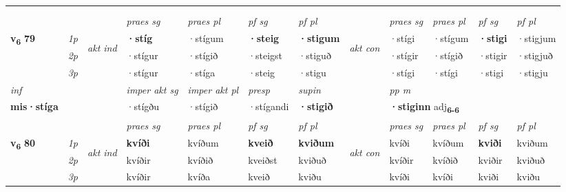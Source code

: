 \begin{longtable}[l]{X>{\footnotesize\itshape}llXXXXlXXXX}
\midrule

   & \\*
  & \\
   \midrule
 & &   & \textit{praes sg}  & \textit{praes pl}    & \textit{ pf sg} & \textit{pf pl} & & \textit{praes sg}  & \textit{praes pl}    & \textit{pf sg} & \textit{pf pl }  \\ \cmidrule{4-7} \cmidrule{9-12}
 \multirow{2}{*}{{{\textbf{v{\textsubscript{6}}} \Large{\textbf{79}}}}}  & 1p & \multirow{3}{*}{\begin{turn}{90}\textit{akt ind}\end{turn}} & \textbf{·stíg} & ·stígum & \textbf{·steig} & \textbf{·stigum} & \multirow{3}{*}{\begin{turn}{90}\textit{akt con}\end{turn}} &·stígi & ·stígum & \textbf{·stigi} & ·stigjum\\*
 & 2p &  &  ·stígur  & ·stígið & ·steigst & ·stiguð & & ·stígir & ·stígið & ·stigir & ·stigjuð \\*
 & 3p &  & ·stígur & ·stíga & ·steig & ·stigu & & ·stígi & ·stígi& ·stigi & ·stigju \\*
\cmidrule{4-7} \cmidrule{9-12}

   {\textit{inf}} & &  & \textit{imper akt sg} & \textit{imper akt pl}   & \textit{presp} & \textit{supin}  && \textit{pp m} \\*
  {\textbf{mis\allowbreak ·stíga}} & && ·stígðu  & ·stígið   & ·stígandi &  \textbf{·stigið}  && \multicolumn{2}{l}{\textbf{·stiginn} adj\textbf{\textsubscript{6-6}}} \\*

\midrule

 & &   & \textit{praes sg}  & \textit{praes pl}    & \textit{ pf sg} & \textit{pf pl} & & \textit{praes sg}  & \textit{praes pl}    & \textit{pf sg} & \textit{pf pl }  \\ \cmidrule{4-7} \cmidrule{9-12}
 \multirow{2}{*}{{{\textbf{v{\textsubscript{6}}} \Large{\textbf{80}}}}}  & 1p & \multirow{3}{*}{\begin{turn}{90}\textit{akt ind}\end{turn}} & \textbf{kvíði} & kvíðum & \textbf{kveið} & \textbf{kviðum} & \multirow{3}{*}{\begin{turn}{90}\textit{akt con}\end{turn}} &kvíði & kvíðum & \textbf{kviði} & kviðum\\*
 & 2p &  &  kvíðir  & kvíðið & kveiðst & kviðuð & & kvíðir & kvíðið & kviðir & kviðuð \\*
 & 3p &  & kvíðir & kvíða & kveið & kviðu & & kvíði & kvíði& kviði & kviðu \\*
\cmidrule{4-7} \cmidrule{9-12}


\end{longtable}

